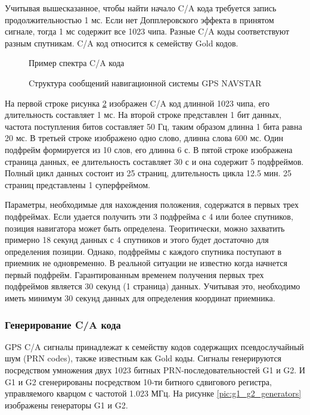 Учитывая вышесказанное, чтобы найти начало C/A кода требуется запись продолжительностью 1 мс. Если нет Допплеровского
эффекта в принятом сигнале, тогда 1 мс содержит все 1023 чипа. Разные C/A коды соответствуют разным спутникам.
C/A код относится к семейству Gold кодов.

\begin{figure}[H]
\begin{center}
\end{center}
\caption{Пример спектра C/A кода}
\label{pic:ca_spectrum}
\end{figure}

\begin{figure}[H]
\begin{center}
\end{center}
\caption{Cтруктура сообщений навигационной системы GPS NAVSTAR}
\label{pic:gps_data_format}
\end{figure}

На первой строке рисунка \ref{pic:gps_data_format} изображен C/A код
длинной 1023 чипа, его длительность составляет 1 мс. На второй строке представлен 1 бит данных, частота поступления
битов составляет 50 Гц, таким образом длинна 1 бита равна 20 мс. В третьей строке изображено одно слово, длинна слова
600 мс. Один подфрейм формируется из 10 слов, его длинна 6 с. В пятой строке изображена страница данных, ее длительность
составляет 30 с и она содержит 5 подфреймов. Полный цикл данных состоит из 25 страниц, длительность цикла 12.5 мин.
25 страниц представлены 1 суперфреймом.

Параметры, необходимые для нахождения положения, содержатся в первых трех подфреймах. Если удается получить эти 3
подфрейма с 4 или более спутников, позиция навигатора может быть определена.  Теоритически, можно захватить примерно
18 секунд данных с 4 спутников и этого будет достаточно для определения позиции. Однако, подфреймы с каждого спутника
поступают в приемник не одновременно. В реальной ситуации не известно когда начнется первый подфрейм. Гарантированным
временем получения первых трех подфреймов является 30 секунд (1 страница) данных. Учитывая это, необходимо иметь
минимум 30 секунд данных для определения координат приемника.

\subsubsection*{Генерирование C/A кода}
GPS C/A сигналы принадлежат к семейству кодов содержащих псевдослучайный шум (PRN codes), также известным как Gold коды.
Сигналы генерируются посредством умножения двух 1023 битных PRN-последовательностей G1 и G2. И G1 и G2 сгенерированы
посредством 10-ти битного сдвигового регистра, управляемого кварцом с частотой 1.023 МГц. На рисунке
\ref{pic:g1_g2_generators} изображены генераторы G1 и G2.

